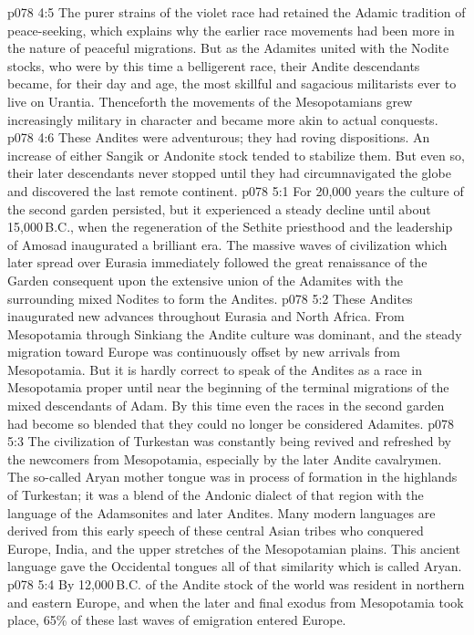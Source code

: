 \vs p078 4:5 \pc The purer strains of the violet race had retained the Adamic tradition of peace\hyp{}seeking, which explains why the earlier race movements had been more in the nature of peaceful migrations. But as the Adamites united with the Nodite stocks, who were by this time a belligerent race, their Andite descendants became, for their day and age, the most skillful and sagacious militarists ever to live on Urantia. Thenceforth the movements of the Mesopotamians grew increasingly military in character and became more akin to actual conquests.
\vs p078 4:6 These Andites were adventurous; they had roving dispositions. An increase of either Sangik or Andonite stock tended to stabilize them. But even so, their later descendants never stopped until they had circumnavigated the globe and discovered the last remote continent.
\vs p078 5:1 For 20,000 years the culture of the second garden persisted, but it experienced a steady decline until about 15,000\,B.C., when the regeneration of the Sethite priesthood and the leadership of Amosad inaugurated a brilliant era. The massive waves of civilization which later spread over Eurasia immediately followed the great renaissance of the Garden consequent upon the extensive union of the Adamites with the surrounding mixed Nodites to form the Andites.
\vs p078 5:2 These Andites inaugurated new advances throughout Eurasia and North Africa. From Mesopotamia through Sinkiang the Andite culture was dominant, and the steady migration toward Europe was continuously offset by new arrivals from Mesopotamia. But it is hardly correct to speak of the Andites as a race in Mesopotamia proper until near the beginning of the terminal migrations of the mixed descendants of Adam. By this time even the races in the second garden had become so blended that they could no longer be considered Adamites.
\vs p078 5:3 The civilization of Turkestan was constantly being revived and refreshed by the newcomers from Mesopotamia, especially by the later Andite cavalrymen. The so\hyp{}called Aryan mother tongue was in process of formation in the highlands of Turkestan; it was a blend of the Andonic dialect of that region with the language of the Adamsonites and later Andites. Many modern languages are derived from this early speech of these central Asian tribes who conquered Europe, India, and the upper stretches of the Mesopotamian plains. This ancient language gave the Occidental tongues all of that similarity which is called Aryan.
\vs p078 5:4 \pc By 12,000\,B.C.  of the Andite stock of the world was resident in northern and eastern Europe, and when the later and final exodus from Mesopotamia took place, 65\% of these last waves of emigration entered Europe.
